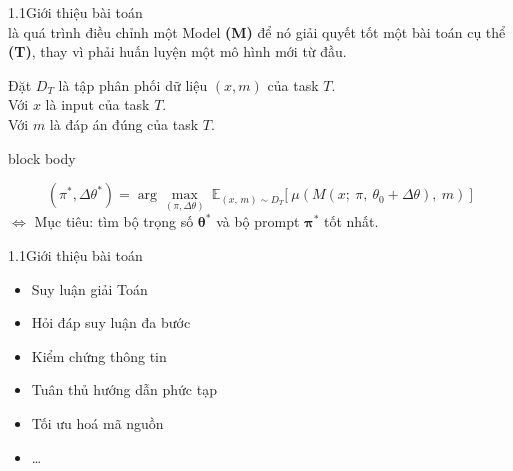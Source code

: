 \begin{frame}{1.1\quad Giới thiệu bài toán}
  \\
  là quá trình điều chỉnh một Model \textbf{(M)} để nó giải quyết tốt một bài toán cụ thể
  \textbf{(T)}, thay vì phải huấn luyện một mô hình mới từ đầu.

  \vspace{0.6em}
  Đặt $D_T$ là tập phân phối dữ liệu $(x, m)$ của task $T$.\\
  Với $x$ là input của task $T$.\\
  Với $m$ là đáp án đúng của task $T$.

  \vspace{0.7em}
  \begin{beamercolorbox}[wd=\linewidth,sep=0.6em]{block body}
    \par\vspace{-0.2em}
    \[ (\pi^*, \Delta\theta^*) = \arg\max_{(\pi, \Delta\theta)}\ \mathbb{E}_{(x,\,m)\sim D_T}\big[\ \mu(M(x;\ \pi,\ \theta_0 + \Delta\theta),\ m)\ \big] \]
    $\Leftrightarrow$ Mục tiêu: tìm bộ trọng số $\boldsymbol{\theta^*}$ và bộ prompt $\boldsymbol{\pi^*}$ tốt nhất.
  \end{beamercolorbox}
\end{frame}

\begin{frame}{1.1\quad Giới thiệu bài toán}
  \vspace{0.3em}
  \begin{itemize}\setlength{\itemsep}{0.45em}
    \item Suy luận giải Toán
    \item Hỏi đáp suy luận đa bước
    \item Kiểm chứng thông tin
    \item Tuân thủ hướng dẫn phức tạp
    \item Tối ưu hoá mã nguồn
    \item \dots
  \end{itemize}
\end{frame}

